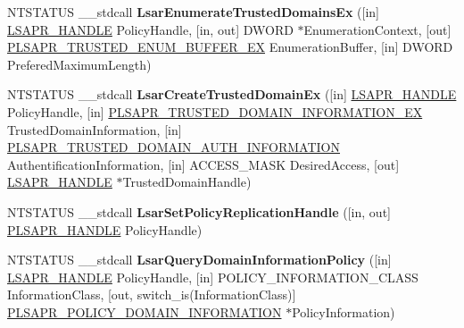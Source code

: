 \begin{DoxyCompactItemize}
N\+T\+S\+T\+A\+T\+US \+\_\+\+\_\+stdcall {\bfseries Lsar\+Enumerate\+Trusted\+Domains\+Ex} (\mbox{[}in\mbox{]} \hyperlink{interfacevoid}{L\+S\+A\+P\+R\+\_\+\+H\+A\+N\+D\+LE} Policy\+Handle, \mbox{[}in, out\mbox{]} D\+W\+O\+RD $\ast$Enumeration\+Context, \mbox{[}out\mbox{]} \hyperlink{struct___l_s_a_p_r___t_r_u_s_t_e_d___e_n_u_m___b_u_f_f_e_r___e_x}{P\+L\+S\+A\+P\+R\+\_\+\+T\+R\+U\+S\+T\+E\+D\+\_\+\+E\+N\+U\+M\+\_\+\+B\+U\+F\+F\+E\+R\+\_\+\+EX} Enumeration\+Buffer, \mbox{[}in\mbox{]} D\+W\+O\+RD Prefered\+Maximum\+Length)
\item 
\mbox{\label{interfacelsarpc_a826c24edb6066e641f6ca5e4cc9f262e}} 
N\+T\+S\+T\+A\+T\+US \+\_\+\+\_\+stdcall {\bfseries Lsar\+Create\+Trusted\+Domain\+Ex} (\mbox{[}in\mbox{]} \hyperlink{interfacevoid}{L\+S\+A\+P\+R\+\_\+\+H\+A\+N\+D\+LE} Policy\+Handle, \mbox{[}in\mbox{]} \hyperlink{struct___l_s_a_p_r___t_r_u_s_t_e_d___d_o_m_a_i_n___i_n_f_o_r_m_a_t_i_o_n___e_x}{P\+L\+S\+A\+P\+R\+\_\+\+T\+R\+U\+S\+T\+E\+D\+\_\+\+D\+O\+M\+A\+I\+N\+\_\+\+I\+N\+F\+O\+R\+M\+A\+T\+I\+O\+N\+\_\+\+EX} Trusted\+Domain\+Information, \mbox{[}in\mbox{]} \hyperlink{struct___l_s_a_p_r___t_r_u_s_t_e_d___d_o_m_a_i_n___a_u_t_h___i_n_f_o_r_m_a_t_i_o_n}{P\+L\+S\+A\+P\+R\+\_\+\+T\+R\+U\+S\+T\+E\+D\+\_\+\+D\+O\+M\+A\+I\+N\+\_\+\+A\+U\+T\+H\+\_\+\+I\+N\+F\+O\+R\+M\+A\+T\+I\+ON} Authentification\+Information, \mbox{[}in\mbox{]} A\+C\+C\+E\+S\+S\+\_\+\+M\+A\+SK Desired\+Access, \mbox{[}out\mbox{]} \hyperlink{interfacevoid}{L\+S\+A\+P\+R\+\_\+\+H\+A\+N\+D\+LE} $\ast$Trusted\+Domain\+Handle)
\item 
\mbox{\label{interfacelsarpc_add6c4cb521a05c14060aa41e97fd144c}} 
N\+T\+S\+T\+A\+T\+US \+\_\+\+\_\+stdcall {\bfseries Lsar\+Set\+Policy\+Replication\+Handle} (\mbox{[}in, out\mbox{]} \hyperlink{interfacevoid}{P\+L\+S\+A\+P\+R\+\_\+\+H\+A\+N\+D\+LE} Policy\+Handle)
\item 
\mbox{\label{interfacelsarpc_a99817f129fb087db58aeba2118da21e7}} 
N\+T\+S\+T\+A\+T\+US \+\_\+\+\_\+stdcall {\bfseries Lsar\+Query\+Domain\+Information\+Policy} (\mbox{[}in\mbox{]} \hyperlink{interfacevoid}{L\+S\+A\+P\+R\+\_\+\+H\+A\+N\+D\+LE} Policy\+Handle, \mbox{[}in\mbox{]} P\+O\+L\+I\+C\+Y\+\_\+\+I\+N\+F\+O\+R\+M\+A\+T\+I\+O\+N\+\_\+\+C\+L\+A\+SS Information\+Class, \mbox{[}out, switch\+\_\+is(Information\+Class)\mbox{]} \hyperlink{union___l_s_a_p_r___p_o_l_i_c_y___d_o_m_a_i_n___i_n_f_o_r_m_a_t_i_o_n}{P\+L\+S\+A\+P\+R\+\_\+\+P\+O\+L\+I\+C\+Y\+\_\+\+D\+O\+M\+A\+I\+N\+\_\+\+I\+N\+F\+O\+R\+M\+A\+T\+I\+ON} $\ast$Policy\+Information)

\end{DoxyCompactItemize}
